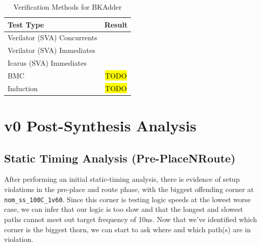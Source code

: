 \documentclass[a4paper]{report}
\begin{document}
				\begin{table}[H]
					\centering
					\begin{tabular}{lc}
						\toprule
						\textbf{Test Type} & \textbf{Result} \\
						\midrule
							Verilator (SVA) Concurrents & \checkmark\\\midrule
							Verilator (SVA) Immediates& \checkmark\\\midrule
							Icarus (SVA) Immediates& \checkmark\\\midrule
							BMC & \XSolidBrush\hl{TODO}\\\midrule
							Induction & \XSolidBrush\hl{TODO}\\
						\bottomrule
					\end{tabular}
					\caption{Verification Methods for BKAdder}
				\end{table}

	\chapter{v0 Post-Synthesis Analysis}

			
		
		\section{Static Timing Analysis (Pre-PlaceNRoute)}

			

			

			After performing an initial static-timing analysis, there
			is evidence of setup violations in the pre-place and route
			phase, with the biggest offending corner at 
			\texttt{nom\_ss\_100C\_1v60}. Since this corner is testing logic
			speeds at the lowest worse case, we can infer that our logic is too slow and
			that the longest and slowest paths cannot meet out target frequency
			of 10ns. Now that we've identified which corner is the biggest thorn, 
			we can start to ask where and which path(s) are in violation. 
\end{document}

